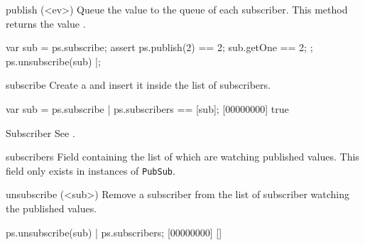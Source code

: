 \begin{urbiscriptapi}

\item[publish](<ev>)%
  Queue the value  to the queue of each subscriber.  This method
  returns the value .

\begin{urbiscript}
{
  var sub = ps.subscribe;
  assert
  {
    ps.publish(2) == 2;
    sub.getOne == 2;
  };
  ps.unsubscribe(sub)
}|;
\end{urbiscript}

\item[subscribe] Create a  and insert it inside the list
  of subscribers.

\begin{urbiscript}
var sub = ps.subscribe |
ps.subscribers == [sub];
[00000000] true
\end{urbiscript}

\item[Subscriber] See .

\item[subscribers] Field containing the list of  which
  are watching published values.  This field only exists in instances of
  \lstinline|PubSub|.

\item[unsubscribe](<sub>)%
  Remove a subscriber from the list of subscriber watching the published
  values.

\begin{urbiscript}
ps.unsubscribe(sub) |
ps.subscribers;
[00000000] []
\end{urbiscript}


\end{urbiscriptapi}

